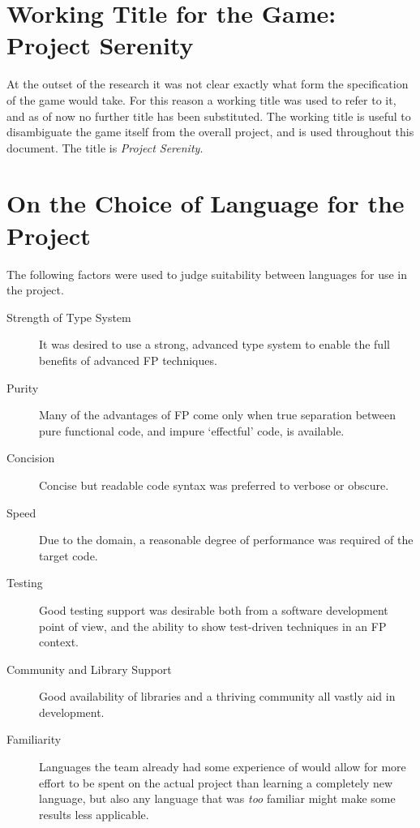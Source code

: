 \section{Working Title for the Game: Project Serenity}

At the outset of the research it was not clear exactly what form the specification of the game would take. For this reason a working title was used to refer to it, and as of now no further title has been substituted. The working title is useful to disambiguate the game itself from the overall project, and is used throughout this document. The title is \emph{Project Serenity}.

\section{On the Choice of Language for the Project}

The following factors were used to judge suitability between languages for use in the project.

\begin{description}
	\item[Strength of Type System] It was desired to use a strong, advanced type system to enable the full benefits of advanced FP techniques.
	\item[Purity] Many of the advantages of FP come only when true separation between pure functional code, and impure `effectful' code, is available.\cite{hudak1989conception}
	\item[Concision] Concise but readable code syntax was preferred to verbose or obscure.
	\item[Speed] Due to the domain, a reasonable degree of performance was required of the target code.
	\item[Testing] Good testing support was desirable both from a software development point of view, and the ability to show test-driven techniques in an FP context.
	\item[Community and Library Support] Good availability of libraries and a thriving community all vastly aid in development.
	\item[Familiarity] Languages the team already had some experience of would allow for more effort to be spent on the actual project than learning a completely new language, but also any language that was \emph{too} familiar might make some results less applicable.
\end{description}

